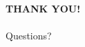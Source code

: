 \documentclass[xcolor=dvipsnames]{beamer}
\begin{document}




\begin{frame}{\ }
\begin{center}
{\bf \Large THANK YOU!} \\ \ \\  
Questions?
\end{center}
\end{frame}

% 


% 
\end{document}
